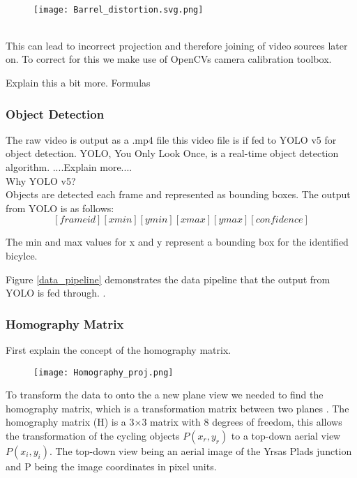 \ \\ 
\begin{figure}[h]
  \texttt{[image: Barrel\_distortion.svg.png]}
  \centering 
  \end{figure}
  \label{distortion}

\ \\
This can lead to incorrect projection and therefore joining of video sources later on.
To correct for this we make use of OpenCVs \cite{noauthor_opencv/opencv_2021} camera calibration toolbox.

Explain this a bit more. Formulas
\ \\
\subsubsection{Object Detection}

The raw video is output as a .mp4 file this video file is if fed to YOLO v5 for object detection. YOLO, You Only Look Once,
is a real-time object detection algorithm. ....Explain more.... 
\ \\ 
Why YOLO v5?
\ \\ 
Objects are detected each frame and represented as bounding boxes.
The output from YOLO is as follows: \[ [frame id][xmin][ymin][xmax][ymax][confidence]  \]

The min and max values for x and y represent a bounding box for the identified bicylce.

Figure \ref{data_pipeline} demonstrates the data pipeline that the output from YOLO is fed through. .
\ \\
\subsubsection{Homography Matrix}

First explain the concept of the homography matrix.
\ \\ 
\begin{figure}[h]
  \texttt{[image: Homography\_proj.png]}
  \centering 
  \end{figure}
  \label{homography}

To transform the data to onto the a new plane view we needed to find the homography matrix, which is a transformation matrix between two planes \cite{hartley_zisserman_2004}.
The homography matrix (H) is a 3×3 matrix with 8 degrees of freedom, this allows the transformation of the cycling objects $P(x_r, y_r)$ to a 
top-down aerial view $P(x_i, y_i)$. The top-down view being an aerial image of the Yrsas Plads junction and P being the image coordinates in pixel units.

